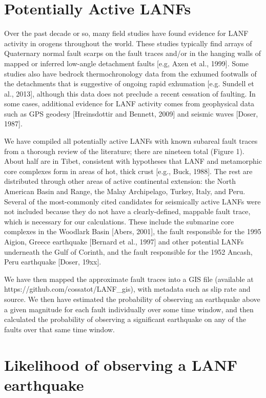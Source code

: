 \documentclass[twocolumn,grl]{AGUTeX}
\begin{document}
\begin{article}
\section{Potentially Active LANFs}

Over the past decade or so, many field studies have found evidence for LANF activity in orogens throughout the world. These studies typically find arrays of Quaternary normal fault scarps on the fault traces and/or in the hanging walls of mapped or inferred low-angle detachment faults [e.g, Axen et al., 1999]. Some studies also have bedrock thermochronology data from the exhumed footwalls of the detachments that is suggestive of ongoing rapid exhumation [e.g. Sundell et al., 2013], although this data does not preclude a recent cessation of faulting. In some cases, additional evidence for LANF activity comes from geophysical data such as GPS geodesy [Hreinsdottir and Bennett, 2009] and seismic waves [Doser, 1987].

We have compiled all potentially active LANFs with known subareal fault traces from a thorough review of the literature; there are nineteen total (Figure 1).  About half are in Tibet, consistent with hypotheses that LANF and metamorphic core complexes form in areas of hot, thick crust [e.g., Buck, 1988].  The rest are distributed through other areas of active continental extension: the North American Basin and Range, the Malay Archipelago, Turkey, Italy, and Peru. Several of the most-commonly cited candidates for seismically active LANFs were not included because they do not have a clearly-defined, mappable fault trace, which is necessary for our calculations.  These include the submarine core complexes in the Woodlark Basin [Abers, 2001], the fault responsible for the 1995 Aigion, Greece earthquake [Bernard et al., 1997] and other potential LANFs underneath the Gulf of Corinth, and the fault responsible for the 1952 Ancash, Peru earthquake [Doser, 19xx].

We have then mapped the approximate fault traces into a GIS file (available at https://github.com/cossatot/LANF\_gis), with metadata such as slip rate and source. We then have estimated the probability of observing an earthquake above a given magnitude for each fault individually over some time window, and then calculated the probability of observing a significant earthquake on any of the faults over that same time window.

\section{Likelihood of observing a LANF earthquake}

\end{article}
\end{document}
